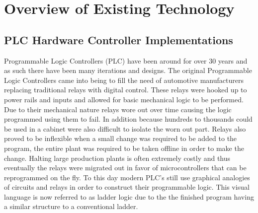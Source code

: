 
\chapter{Overview of Existing Technology}
\section{PLC Hardware Controller Implementations}
Programmable Logic Controllers (PLC) have been around for over 30 years and as such there have been many iterations and designs. The original Programmable Logic Controllers came into being to fill the need of automotive manufacturers replacing traditional relays with digital control. These relays were hooked up to power rails and inputs and allowed for basic mechanical logic to be performed. Due to their mechanical nature relays wore out over time causing the logic programmed using them to fail. In addition because hundreds to thousands could be used in a cabinet were also difficult to isolate the worn out part. Relays also proved to be inflexible when a small change was required to be added to the program, the entire plant was required to be taken offline in order to make the change. Halting large production plants is often extremely costly and thus eventually the relays were migrated out in favor of microcontrollers that can be reprogrammed on the fly. To this day modern PLC's still use graphical analogies of circuits and relays in order to construct their programmable logic. This visual language is now referred to as ladder logic due to the the finished program having a similar structure to a conventional ladder. 

